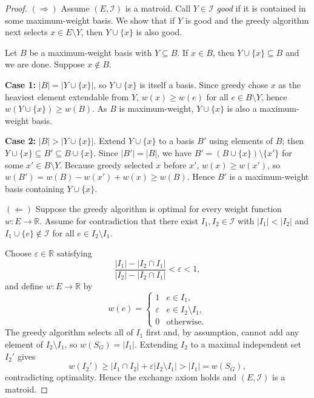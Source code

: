 \documentclass[11pt]{article}
\theoremstyle{plain}
\theoremstyle{definition}
\begin{document}
\begin{proof}
$(\Rightarrow)$
Assume $(E, \mathcal{I})$ is a matroid.
Call $Y \in \mathcal{I}$ \emph{good} if it is contained in some
maximum-weight basis.
We show that if $Y$ is good and the greedy algorithm next selects
$x \in E \setminus Y$, then $Y \cup \{x\}$ is also good.
 
Let $B$ be a maximum-weight basis with $Y \subseteq B$.
If $x \in B$, then $Y \cup \{x\} \subseteq B$ and we are done.
Suppose $x \notin B$.
 
\medskip\noindent
\textbf{Case 1:} $|B| = |Y \cup \{x\}|$, so $Y \cup \{x\}$ is itself a basis.
Since greedy chose $x$ as the heaviest element extendable from $Y$,
$w(x) \ge w(e)$ for all $e \in B \setminus Y$, hence
$w(Y \cup \{x\}) \ge w(B)$.
As $B$ is maximum-weight, $Y \cup \{x\}$ is also a maximum-weight basis.
 
\medskip\noindent
\textbf{Case 2:} $|B| > |Y \cup \{x\}|$.
Extend $Y \cup \{x\}$ to a basis $B'$ using elements of $B$;
then $Y \cup \{x\} \subseteq B' \subseteq B \cup \{x\}$.
Since $|B'| = |B|$, we have $B' = (B \cup \{x\}) \setminus \{x'\}$
for some $x' \in B \setminus Y$.
Because greedy selected $x$ before $x'$, $w(x) \ge w(x')$, so
$w(B') = w(B) - w(x') + w(x) \ge w(B)$.
Hence $B'$ is a maximum-weight basis containing $Y \cup \{x\}$.
 
\medskip
$(\Leftarrow)$
Suppose the greedy algorithm is optimal for every weight function
$w : E \to \mathbb{R}$.
Assume for contradiction that there exist $I_1, I_2 \in \mathcal{I}$ with
$|I_1| < |I_2|$ and $I_1 \cup \{e\} \notin \mathcal{I}$ for all
$e \in I_2 \setminus I_1$.
 
Choose $\varepsilon \in \mathbb{R}$ satisfying
\[
  \frac{|I_1| - |I_2 \cap I_1|}{|I_2| - |I_2 \cap I_1|} < \varepsilon < 1,
\]
and define $w : E \to \mathbb{R}$ by
\[
  w(e) = \begin{cases}
    1          & e \in I_1, \\
    \varepsilon & e \in I_2 \setminus I_1, \\
    0          & \text{otherwise.}
  \end{cases}
\]
The greedy algorithm selects all of $I_1$ first and, by assumption, cannot
add any element of $I_2 \setminus I_1$, so $w(S_G) = |I_1|$.
Extending $I_2$ to a maximal independent set $I_2'$ gives
\[
  w(I_2') \ge |I_1 \cap I_2| + \varepsilon|I_2 \setminus I_1|
           > |I_1| = w(S_G),
\]
contradicting optimality.
Hence the exchange axiom holds and $(E, \mathcal{I})$ is a matroid.
\end{proof}
 
\end{document}

